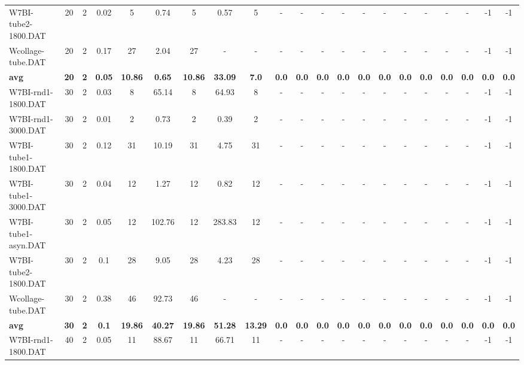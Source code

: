 \begin{sidewaystable}[!ht]
{\begin{tabular}{lcccccccccccccccccccc}
W7BI-tube2-1800.DAT & 20 & 2 &  \textcolor{blue2}{0.02} & 5 & 0.74 & 5 & 0.57 & 5 &  - &  - &  - &  - &  - &  - &  - &  - &  - &  - & -1 & -1 \\
Wcollage-tube.DAT & 20 & 2 &  \textcolor{blue2}{0.17} & 27 & 2.04 & 27 &  - &  - &  - &  - &  - &  - &  - &  - &  - &  - &  - &  - & -1 & -1 \\
\cline{1-21} \textbf{avg} & \textbf{20} & \textbf{2} & \textbf{0.05} & \textbf{10.86} & \textbf{0.65} & \textbf{10.86} & \textbf{33.09} & \textbf{7.0} & \textbf{0.0} & \textbf{0.0} & \textbf{0.0} & \textbf{0.0} & \textbf{0.0} & \textbf{0.0} & \textbf{0.0} & \textbf{0.0} & \textbf{0.0} & \textbf{0.0} & \textbf{0.0} & \textbf{0.0} \\ \cline{1-21}
W7BI-rnd1-1800.DAT & 30 & 2 &  \textcolor{blue2}{0.03} & 8 & 65.14 & 8 & 64.93 & 8 &  - &  - &  - &  - &  - &  - &  - &  - &  - &  - & -1 & -1 \\
W7BI-rnd1-3000.DAT & 30 & 2 &  \textcolor{blue2}{0.01} & 2 & 0.73 & 2 & 0.39 & 2 &  - &  - &  - &  - &  - &  - &  - &  - &  - &  - & -1 & -1 \\
W7BI-tube1-1800.DAT & 30 & 2 &  \textcolor{blue2}{0.12} & 31 & 10.19 & 31 & 4.75 & 31 &  - &  - &  - &  - &  - &  - &  - &  - &  - &  - & -1 & -1 \\
W7BI-tube1-3000.DAT & 30 & 2 &  \textcolor{blue2}{0.04} & 12 & 1.27 & 12 & 0.82 & 12 &  - &  - &  - &  - &  - &  - &  - &  - &  - &  - & -1 & -1 \\
W7BI-tube1-asyn.DAT & 30 & 2 &  \textcolor{blue2}{0.05} & 12 & 102.76 & 12 & 283.83 & 12 &  - &  - &  - &  - &  - &  - &  - &  - &  - &  - & -1 & -1 \\
W7BI-tube2-1800.DAT & 30 & 2 &  \textcolor{blue2}{0.1} & 28 & 9.05 & 28 & 4.23 & 28 &  - &  - &  - &  - &  - &  - &  - &  - &  - &  - & -1 & -1 \\
Wcollage-tube.DAT & 30 & 2 &  \textcolor{blue2}{0.38} & 46 & 92.73 & 46 &  - &  - &  - &  - &  - &  - &  - &  - &  - &  - &  - &  - & -1 & -1 \\
\cline{1-21} \textbf{avg} & \textbf{30} & \textbf{2} & \textbf{0.1} & \textbf{19.86} & \textbf{40.27} & \textbf{19.86} & \textbf{51.28} & \textbf{13.29} & \textbf{0.0} & \textbf{0.0} & \textbf{0.0} & \textbf{0.0} & \textbf{0.0} & \textbf{0.0} & \textbf{0.0} & \textbf{0.0} & \textbf{0.0} & \textbf{0.0} & \textbf{0.0} & \textbf{0.0} \\ \cline{1-21}
W7BI-rnd1-1800.DAT & 40 & 2 &  \textcolor{blue2}{0.05} & 11 & 88.67 & 11 & 66.71 & 11 &  - &  - &  - &  - &  - &  - &  - &  - &  - &  - & -1 & -1 \\

\end{tabular}}
\end{sidewaystable}
